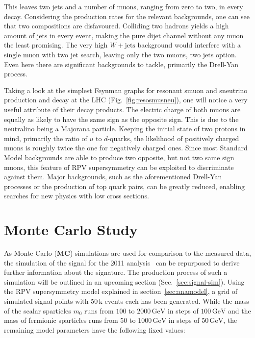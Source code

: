 This leaves two jets and a number of muons, ranging from zero to two, in every decay. Considering the production rates for the relevant backgrounds, one can see that two compositions are disfavoured. Colliding two hadrons yields a high amount of jets in every event, making the pure dijet channel without any muon the least promising. The very high $W + \text{jets}$ background would interfere with a single muon with two jet search, leaving only the two muons, two jets option. Even here there are significant backgrounds to tackle, primarily the Drell-Yan process.

Taking a look at the simplest Feynman graphs for resonant smuon and sneutrino production and decay at the LHC (Fig.~\ref{fig:resosmusneu}), one will notice a very useful attribute of their decay products. The electric charge of both muons are equally as likely to have the same sign as the opposite sign. This is due to the neutralino being a Majorana particle. Keeping the initial state of two protons in mind, primarily the ratio of $u$ to $d$-quarks, the likelihood of positively charged muons is roughly twice the one for negatively charged ones. Since most Standard Model backgrounds are able to produce two opposite, but not two same sign muons, this feature of RPV supersymmetry can be exploited to discriminate against them. Major backgrounds, such as the aforementioned Drell-Yan processes or the production of top quark pairs, can be greatly reduced, enabling searches for new physics with low cross sections.


\section{Monte Carlo Study}
\label{sec:mcstudy}

As Monte Carlo (\textbf{MC}) simulations are used for comparison to the measured data, the simulation of the signal for the 2011 analysis~\cite{2011rpv} can be repurposed to derive further information about the signature. The production process of such a simulation will be outlined in an upcoming section (Sec.~\ref{sec:signal-sim}). Using the RPV supersymmetry model explained in section~\ref{sec:anamodel}, a grid of simulated signal points with $50\,\text{k}$ events each has been generated. While the mass of the scalar sparticles $m_0$ runs from $100$ to $2000\,\text{GeV}$ in steps of $100\,\text{GeV}$ and the mass of fermionic sparticles runs from $50$ to $1000\,\text{GeV}$ in steps of $50\,\text{GeV}$, the remaining model parameters have the following fixed values:

